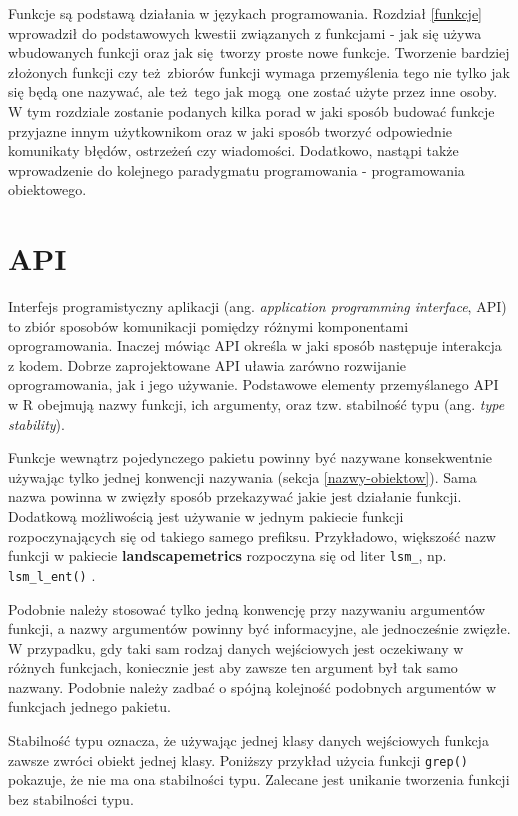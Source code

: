 \documentclass[paper=6in:9in,pagesize=pdftex,headinclude=on,footinclude=on,10pt]{scrbook}
\begin{document}
Funkcje są podstawą działania w językach programowania.
Rozdział \ref{funkcje} wprowadził do podstawowych kwestii związanych z funkcjami - jak się używa wbudowanych funkcji oraz jak się~tworzy proste nowe funkcje.
Tworzenie bardziej złożonych funkcji czy też~zbiorów funkcji wymaga przemyślenia tego nie tylko jak się będą one nazywać, ale też~tego jak mogą~one zostać użyte przez inne osoby.
W tym rozdziale zostanie podanych kilka porad w jaki sposób budować funkcje przyjazne innym użytkownikom oraz w jaki sposób tworzyć odpowiednie komunikaty błędów, ostrzeżeń czy wiadomości.
Dodatkowo, nastąpi także wprowadzenie do kolejnego paradygmatu programowania - programowania obiektowego.

\hypertarget{api}{%
\section{API}\label{api}}

Interfejs programistyczny aplikacji (ang. \emph{application programming interface}, API) to zbiór sposobów komunikacji pomiędzy różnymi komponentami oprogramowania.
Inaczej mówiąc API określa w jaki sposób następuje interakcja z kodem.
Dobrze zaprojektowane API uławia zarówno rozwijanie oprogramowania, jak i jego używanie.
Podstawowe elementy przemyślanego API w R obejmują nazwy funkcji, ich argumenty, oraz tzw. stabilność typu (ang. \emph{type stability}).

Funkcje wewnątrz pojedynczego pakietu powinny być nazywane konsekwentnie używając tylko jednej konwencji nazywania (sekcja \ref{nazwy-obiektow}).
Sama nazwa powinna w zwięzły sposób przekazywać jakie jest działanie funkcji.
Dodatkową możliwością jest używanie w jednym pakiecie funkcji rozpoczynających się od takiego samego prefiksu.
Przykładowo, większość nazw funkcji w pakiecie \textbf{landscapemetrics} rozpoczyna się od liter \texttt{lsm\_}, np. \texttt{lsm\_l\_ent()} \citep{R-landscapemetrics}.

Podobnie należy stosować tylko jedną konwencję przy nazywaniu argumentów funkcji, a nazwy argumentów powinny być informacyjne, ale jednocześnie zwięzłe.
W przypadku, gdy taki sam rodzaj danych wejściowych jest oczekiwany w różnych funkcjach, koniecznie jest aby zawsze ten argument był tak samo nazwany.
Podobnie należy zadbać o spójną kolejność podobnych argumentów w funkcjach jednego pakietu.

Stabilność typu oznacza, że używając jednej klasy danych wejściowych funkcja zawsze zwróci obiekt jednej klasy.
Poniższy przykład użycia funkcji \texttt{grep()} pokazuje, że nie ma ona stabilności typu.
Zalecane jest unikanie tworzenia funkcji bez stabilności typu.
\end{document}
